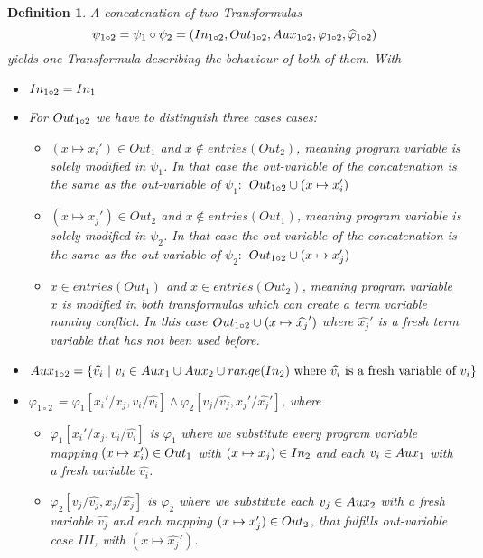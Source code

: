 \documentclass{article}
\newtheorem{mydef}{Definition}
\begin{document}
	\begin{mydef}
		A concatenation of two Transformulas 
		\begin{equation*}
		\psi_{1 \circ 2} = \psi_1 \circ \psi_2 = (In_{1 \circ 2}, Out_{1 \circ 2}, Aux_{1 \circ 2}, \varphi_{1 \circ 2}, \widehat{\varphi}_{1 \circ 2})
		\end{equation*}  yields one Transformula describing the behaviour of both of them. With
		\begin{itemize}
			\item $In_{1 \circ 2} = In_1$
			\item For $Out_{1 \circ 2}$ we have to distinguish three cases cases: 
			\begin{itemize}
				
				\item[I:] $(x \mapsto x_i') \in Out_1$ and $x  \not\in entries(Out_2)$, meaning program variable is solely modified in $\psi_1$. In that case the out-variable of the concatenation is the same as the out-variable of $\psi_1: $ $Out_{1 \circ 2} \cup (x \mapsto x_i')$ 
				\item[II:] $(x \mapsto x_j') \in Out_2$ and $x  \not\in entries(Out_1)$, meaning program variable is solely modified in $\psi_2$. In that case the out variable of the concatenation is the same as the out-variable of $\psi_2: $ $Out_{1 \circ 2} \cup (x \mapsto x_j')$ 
				\item[III:] $x \in entries(Out_1)$ and $x \in entries(Out_2)$, meaning program variable $x$ is modified in both transformulas which can create a term variable naming conflict. 
				In this case $Out_{1 \circ 2} \cup (x \mapsto \widehat{x_j}')$ where $\widehat{x_j}'$ is a fresh term variable that has not been used before.
				
			\end{itemize}

			\item $Aux_{1 \circ 2} = \{ \widehat{v_i} \ |\ v_i \in Aux_1 \cup Aux_2 \cup range(In_2) \text{ where } \widehat{v_i} \text{ is a fresh variable of } v_i \}$
			\item $\varphi_{1 \circ 2}$ = $\varphi_1[x_i' / x_j, v_i / \widehat{v_i} ] \land \varphi_2[v_j / \widehat{v_j}, x_j' / \widehat{x_j}']$, where
			 \begin{itemize}
				\item $\varphi_1[x_i' / x_j, v_i / \widehat{v_i} ] $ is $\varphi_1$ where we substitute every program variable mapping $(x \mapsto x_i') \in Out_1$ with $(x \mapsto x_j) \in In_2$ and each $v_i \in Aux_1$ with a fresh variable $\widehat{v_i}$.
				\item  $\varphi_2[v_j / \widehat{v_j}, x_j / \widehat{x_j}]$ is $\varphi_2$ where we substitute each $v_j \in Aux_2$ with a fresh variable $\widehat{v_j}$ and each mapping $(x \mapsto x_j') \in Out_2$, that fulfills out-variable case $III$, with $(x \mapsto \widehat{x_j}')$.
			\end{itemize} 
			

\end{itemize}
\end{mydef}
\end{document}
